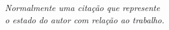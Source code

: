 \begin{epigrafe}
    \vspace*{\fill}
	\begin{flushright}
		\textit{Normalmente uma citação que represente\\
			    o estado do autor com relação ao trabalho.}
	\end{flushright}
\end{epigrafe}